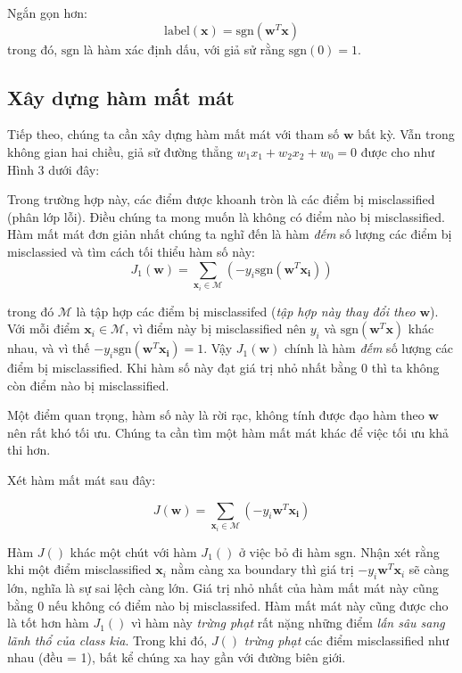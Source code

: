 Ngắn gọn hơn:  
\begin{equation*} 
\text{label}(\mathbf{x}) = \text{sgn}(\mathbf{w}^T\mathbf{x}) 
\end{equation*} 
trong đó, $\text{sgn}$ là hàm xác định dấu, với giả sử rằng $\text{sgn}(0) = 1$. 
 
 
\subsection{Xây dựng hàm mất mát}
Tiếp theo, chúng ta cần xây dựng hàm mất mát với tham số $\mathbf{w}$ bất kỳ. Vẫn trong không gian hai chiều, giả sử đường thẳng $w_1x_1 + w_2x_2 + w_0 = 0$ được cho như Hình 3 dưới đây: 
 
Trong trường hợp này, các điểm được khoanh tròn là các điểm bị misclassified (phân lớp lỗi). Điều chúng ta mong muốn là không có điểm nào bị misclassified. Hàm mất mát đơn giản nhất chúng ta nghĩ đến là hàm \textit{đếm} số lượng các điểm bị misclassied và tìm cách tối thiểu hàm số này: 
\begin{equation*} 
J_1(\mathbf{w}) = \sum_{\mathbf{x}_i \in \mathcal{M}} (-y_i\text{sgn}(\mathbf{w}^T\mathbf{x_i})) 
\end{equation*} 
 
trong đó $\mathcal{M}$ là tập hợp các điểm bị misclassifed (\textit{tập hợp này thay đổi theo} $\mathbf{w}$). Với mỗi điểm $\mathbf{x}_i \in \mathcal{M}$, vì điểm này bị misclassified nên $y_i$ và $\text{sgn}(\mathbf{w}^T\mathbf{x})$ khác nhau, và vì thế $-y_i\text{sgn}(\mathbf{w}^T\mathbf{x_i}) = 1 $. Vậy $J_1(\mathbf{w})$ chính là hàm \textit{đếm} số lượng các điểm bị misclassified. Khi hàm số này đạt giá trị nhỏ nhất bằng 0 thì ta không còn điểm nào bị misclassified.  
 
Một điểm quan trọng, hàm số này là rời rạc, không tính được đạo hàm theo $\mathbf{w}$ nên rất khó tối ưu. Chúng ta cần tìm một hàm mất mát khác để việc tối ưu khả thi hơn. 
 
Xét hàm mất mát sau đây:  
 
\begin{equation*} 
J(\mathbf{w}) = \sum_{\mathbf{x}_i \in \mathcal{M}} (-y_i\mathbf{w}^T\mathbf{x_i}) 
\end{equation*} 
 
Hàm $J()$ khác một chút với hàm $J_1()$ ở việc bỏ đi hàm $\text{sgn}$. Nhận xét rằng khi một điểm misclassified $\mathbf{x}_i$ nằm càng xa boundary thì giá trị $-y_i\mathbf{w}^T\mathbf{x}_i$ sẽ càng lớn, nghĩa là sự sai lệch càng lớn. Giá trị nhỏ nhất của hàm mất mát này cũng bằng 0 nếu không có điểm nào bị misclassifed. Hàm mất mát này cũng được cho là tốt hơn hàm $J_1()$ vì hàm này \textit{trừng phạt} rất nặng những điểm \textit{lấn sâu sang lãnh thổ của class kia}. Trong khi đó, $J()$ \textit{trừng phạt} các điểm misclassified như nhau (đều = 1), bất kể chúng xa hay gần với đường biên giới. 
 
